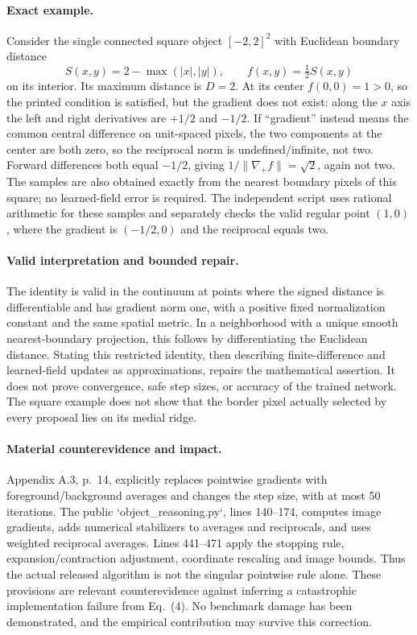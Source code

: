 \documentclass[10pt]{article}
\begin{document}
\paragraph*{Exact example.}\mbox{}\par
Consider the single connected square object \([-2,2]^2\) with Euclidean boundary distance \[S(x,y)=2-\max(|x|,|y|),\qquad f(x,y)=\tfrac12S(x,y)\] on its interior. Its maximum distance is \(D=2\). At its center \(f(0,0)=1>0\), so the printed condition is satisfied, but the gradient does not exist: along the \(x\) axis the left and right derivatives are \(+1/2\) and \(-1/2\). If “gradient” instead means the common central difference on unit-spaced pixels, the two components at the center are both zero, so the reciprocal norm is undefined/infinite, not two. Forward differences both equal \(-1/2\), giving \(1/\|\nabla_+f\|=\sqrt2\), again not two. The samples are also obtained exactly from the nearest boundary pixels of this square; no learned-field error is required. The independent script uses rational arithmetic for these samples and separately checks the valid regular point \((1,0)\), where the gradient is \((-1/2,0)\) and the reciprocal equals two.\par
\paragraph*{Valid interpretation and bounded repair.}\mbox{}\par
The identity is valid in the continuum at points where the signed distance is differentiable and has gradient norm one, with a positive fixed normalization constant and the same spatial metric. In a neighborhood with a unique smooth nearest-boundary projection, this follows by differentiating the Euclidean distance. Stating this restricted identity, then describing finite-difference and learned-field updates as approximations, repairs the mathematical assertion. It does not prove convergence, safe step sizes, or accuracy of the trained network. The square example does not show that the border pixel actually selected by every proposal lies on its medial ridge.\par
\paragraph*{Material counterevidence and impact.}\mbox{}\par
Appendix A.3, p. 14, explicitly replaces pointwise gradients with foreground/background averages and changes the step size, with at most 50 iterations. The public `object\_reasoning.py`, lines 140–174, computes image gradients, adds numerical stabilizers to averages and reciprocals, and uses weighted reciprocal averages. Lines 441–471 apply the stopping rule, expansion/contraction adjustment, coordinate rescaling and image bounds. Thus the actual released algorithm is not the singular pointwise rule alone. These provisions are relevant counterevidence against inferring a catastrophic implementation failure from Eq. (4). No benchmark damage has been demonstrated, and the empirical contribution may survive this correction.\par
\end{document}
